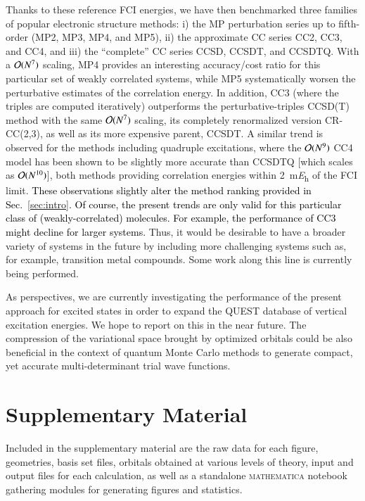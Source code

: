 \documentclass[aip,jcp,reprint,noshowkeys,superscriptaddress,floatfix]{revtex4-1}
\newcommand{\alert}[1]{\textcolor{black}{#1}}
\begin{document}
Thanks to these reference FCI energies, we have then benchmarked three families of popular electronic structure methods: i) the MP perturbation series up to fifth-order (MP2, MP3, MP4, and MP5), ii) the approximate CC series CC2, CC3, and CC4, and iii) the ``complete'' CC series CCSD, CCSDT, and CCSDTQ.
With a $\order*{N^7}$ scaling, MP4 provides an interesting accuracy/cost ratio for this particular set of weakly correlated systems, while MP5 systematically worsen the perturbative estimates of the correlation energy.
In addition, CC3 (where the triples are computed iteratively) outperforms the perturbative-triples CCSD(T) method with the same $\order*{N^7}$ scaling, its completely renormalized version CR-CC(2,3), as well as its more expensive parent, CCSDT.
A similar trend is observed for the methods including quadruple excitations, where the $\order*{N^9}$ CC4 model has been shown to be slightly more accurate than CCSDTQ [which scales as $\order*{N^{10}}$], both methods providing correlation energies within \SI{2}{\milli\hartree} of the FCI limit.
\alert{These observations slightly alter the method ranking provided in Sec.~\ref{sec:intro}.
Of course, the present trends are only valid for this particular class of (weakly-correlated) molecules.
For example, the performance of CC3 might decline for larger systems.} 
Thus, it would be desirable to have a broader variety of systems in the future by including more challenging systems such as, for example, transition metal compounds.
Some work along this line is currently being performed.

As perspectives, we are currently investigating the performance of the present approach for excited states in order to expand the QUEST database of vertical excitation energies. \cite{Veril_2021} 
We hope to report on this in the near future.
The compression of the variational space brought by optimized orbitals could be also beneficial in the context of quantum Monte Carlo methods to generate compact, yet accurate multi-determinant trial wave functions. \cite{Dash_2018,Dash_2019,Scemama_2020,Dash_2021}

\section*{Supplementary Material}
Included in the supplementary material are the raw data for each figure, geometries, basis set files, orbitals obtained at various levels of theory, input and output files for each calculation, as well as a standalone \textsc{mathematica} notebook gathering modules for generating figures and statistics.
\end{document}
